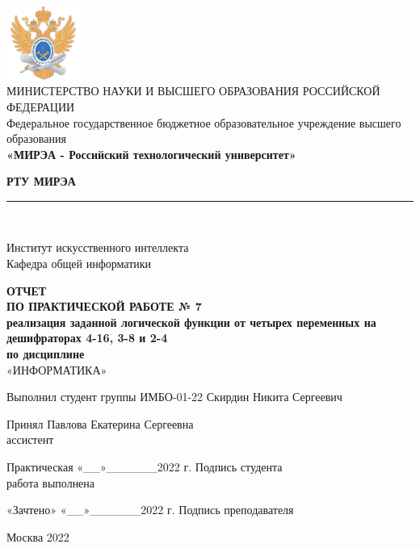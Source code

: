 \documentclass[14pt, a4paper]{extreport}
\newcommand{\doublerule}[1][.4pt]{%
	\noindent
	\makebox[0pt][l]{\rule[.6ex]{\linewidth}{#1}}%
	\rule[.3ex]{\linewidth}{#1}
}
\begin{document}
\begin{titlepage}
	\begin{center}
		\vspace*{0.5mm}

		\includegraphics[width=0.18\textwidth]{logo}\\
		\footnotesize
		МИНИСТЕРСТВО НАУКИ И ВЫСШЕГО ОБРАЗОВАНИЯ РОССИЙСКОЙ ФЕДЕРАЦИИ\\
		\small
		Федеральное государственное бюджетное образовательное учреждение высшего образования\\
		\textbf{«МИРЭА - Российский технологический университет»}
		\vspace{0.5cm}

		\large \textbf{РТУ МИРЭА} \normalsize

		\doublerule[1pt]\\
		\vspace{0.4cm}

		Институт искусственного интеллекта\\
		Кафедра общей информатики
		\vspace{1.5cm}

		\textbf{ОТЧЕТ}\\
		\textbf{ПО ПРАКТИЧЕСКОЙ РАБОТЕ № 7}\\
		\textbf{реализация заданной логической функции от четырех переменных на дешифраторах 4-16, 3-8 и 2-4}\\
		\textbf{по дисциплине}\\
		«ИНФОРМАТИКА»
		\vspace{1.5cm}

		\small
		Выполнил студент группы ИМБО-01-22 \hfill Скирдин Никита Сергеевич
		\vspace{1cm}

		Принял \hfill Павлова Екатерина Сергеевна\\
		ассистент \hfill
		\vspace{1.5cm}

		\footnotesize
		\hspace{0.5cm} Практическая \hfill «\_\_»\_\_\_\_\_\_2022 г. \hfill Подпись студента\\
		\hspace{0.5cm} работа выполнена \hfill
		\vspace{0.5cm}

		\hspace{2cm} «Зачтено» \hfill «\_\_»\_\_\_\_\_\_2022 г. \hfill Подпись преподавателя
		\vfill

		\small
		Москва 2022
	\end{center}
	\thispagestyle{empty}
\end{titlepage}
\end{document}
